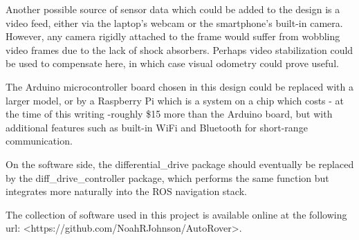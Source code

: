 



Another possible source of sensor data which could be added to the design is a video feed, either via the laptop's webcam or the smartphone's built-in camera. However, any camera rigidly attached to the frame would suffer from wobbling video frames due to the lack of shock absorbers. Perhaps video stabilization could be used to compensate here, in which case visual odometry could prove useful.

The Arduino microcontroller board chosen in this design could be replaced with a larger model, or by a Raspberry Pi which is a system on a chip which costs - at the time of this writing -roughly \$15 more than the Arduino board, but with additional features such as built-in WiFi and Bluetooth for short-range communication. 

On the software side, the differential\_drive package should eventually be replaced by the diff\_drive\_controller package, which performs the same function but integrates more naturally into the ROS navigation stack.



The collection of software used in this project is available online at the following url:
<https://github.com/NoahRJohnson/AutoRover>.

